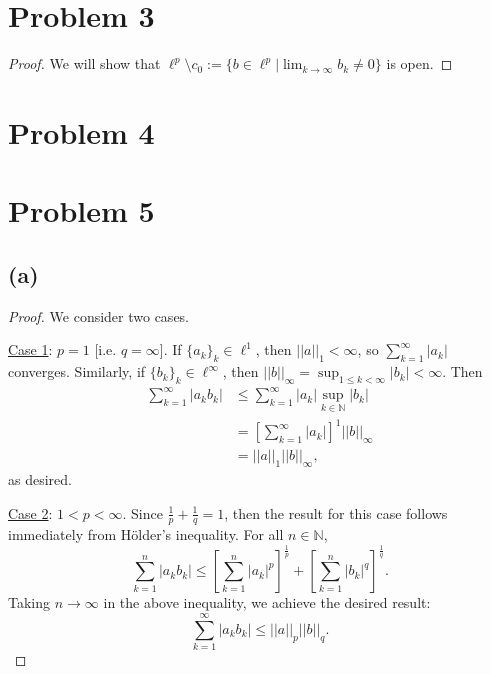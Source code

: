 \documentclass{article}
\begin{document}
\section*{Problem 3}
\begin{proof}
	We will show that $\ell^p \setminus c_0 := \{b\in\ell^p | \lim_{k \to\infty} b_k \neq 0\}$ is open. 
\end{proof}

\section*{Problem 4}
\section*{Problem 5}
\subsection*{(a)}
\begin{proof}
	We consider two cases. 
	
	\underline{Case 1}: $p=1$ [i.e. $q=\infty$]. If $\{a_k\}_k\in\ell^1$, then $||a||_1 < \infty$, so $\sum_{k=1}^{\infty} |a_k|$ converges. Similarly, if $\{b_k\}_k\in\ell^{\infty}$, then $||b||_{\infty} = \sup_{1\leq k <  \infty}|b_k|<\infty$. Then
	\begin{align}
		\sum_{k=1}^{\infty}|a_k b_k| &\leq \sum_{k=1}^{\infty}|a_k|\sup_{k\in\mathbb{N}}|b_k| \\
		&= \left[\sum_{k=1}^{\infty}|a_k|\right]^1 ||b||_{\infty} \\
		&= ||a||_1||b||_{\infty},
	\end{align}
	as desired.
	
	\underline{Case 2}: $1<p<\infty$. Since $\frac{1}{p} + \frac{1}{q}=1$, then the result for this case follows immediately from Hölder's inequality. For all $n\in\mathbb{N}$, 
	\begin{equation}
		\sum_{k=1}^n |a_k b_k| \leq \left[\sum_{k=1}^n |a_k|^p\right]^\frac{1}{p} + \left[\sum_{k=1}^n |b_k|^q\right]^\frac{1}{q}.
	\end{equation}
	Taking $n\to\infty$ in the above inequality, we achieve the desired result:
	\begin{equation}
		\sum_{k=1}^{\infty} |a_k b_k| \leq ||a||_p||b||_q. 
	\end{equation}
\end{proof}
\end{document}
